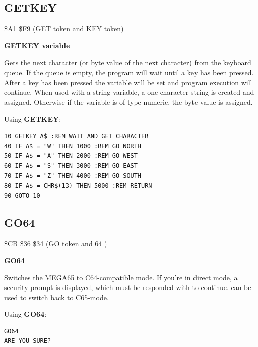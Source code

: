 \subsection{GETKEY}
\begin{description}[leftmargin=2cm,style=nextline]
\item [Token:] \$A1 \$F9 (GET token and KEY token)
\item [Format:] {\bf GETKEY variable}
\item [Usage:] Gets the next character (or byte value of the next character)
               from the keyboard queue. If the queue is empty,
               the program will wait until a key has been pressed.
               After a key has been pressed the variable will be set
               and program execution will continue. When used with
               a string variable, a one character string is created and assigned.
               Otherwise if the variable is of type numeric, the byte value
               is assigned.

\item [Example:] Using {\bf GETKEY}:
\begin{tcolorbox}[colback=black,coltext=white]
\verbatimfont{\codefont}
\begin{verbatim}
10 GETKEY A$ :REM WAIT AND GET CHARACTER
40 IF A$ = "W" THEN 1000 :REM GO NORTH
50 IF A$ = "A" THEN 2000 :REM GO WEST
60 IF A$ = "S" THEN 3000 :REM GO EAST
70 IF A$ = "Z" THEN 4000 :REM GO SOUTH
80 IF A$ = CHR$(13) THEN 5000 :REM RETURN
90 GOTO 10
\end{verbatim}
\end{tcolorbox}
\end{description}


\newpage
\subsection{GO64}
\begin{description}[leftmargin=2cm,style=nextline]
\item [Token:] \$CB \$36 \$34 (GO token and 64 )
\item [Format:] {\bf GO64}
\item [Usage:] Switches the
               MEGA65 to C64-compatible mode. If you're in direct
               mode, a security prompt 
               is displayed, which must be responded with  to
               continue.  can be used to switch back
               to C65-mode.

\item [Example:] Using {\bf GO64}:
\begin{tcolorbox}[colback=black,coltext=white]
\verbatimfont{\codefont}
\begin{verbatim}
GO64
ARE YOU SURE?
\end{verbatim}
\end{tcolorbox}
\end{description}

